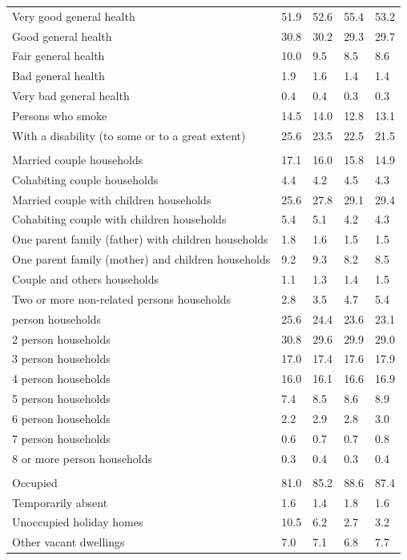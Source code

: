 \documentclass{article}
\begin{document}
\begin{table}[h]
\begin{tabular}{KTTTT}
    \hline
Very good general health & 51.9& 52.6&55.4& 53.2\\
Good general health & 30.8& 30.2& 29.3& 29.7\\
Fair general health & 10.0&  9.5& 8.5&  8.6\\
Bad general health & 1.9& 1.6&1.4& 1.4\\
Very bad general health & 0.4& 0.4&0.3& 0.3\\
    \hline
Persons who smoke & 14.5& 14.0&12.8& 13.1\\
    \hline
With a disability (to some or to a great extent) & 25.6& 23.5&22.5& 21.5\\
\hline
    \\ 
    \hline
Married couple households & 17.1& 16.0& 15.8& 14.9\\
Cohabiting couple households & 4.4& 4.2& 4.5& 4.3\\
Married couple with children households & 25.6& 27.8& 29.1& 29.4\\
Cohabiting couple with children households & 5.4& 5.1& 4.2& 4.3\\
One parent family (father) with  children households & 1.8& 1.6& 1.5& 1.5\\
One parent family (mother) and children households & 9.2& 9.3& 8.2& 8.5\\
Couple and others households  & 1.1& 1.3& 1.4& 1.5\\
Two or more non-related persons households & 2.8& 3.5& 4.7& 5.4\\
     person households & 25.6& 24.4& 23.6& 23.1\\
2 person households & 30.8& 29.6& 29.9& 29.0\\
3 person households & 17.0& 17.4& 17.6& 17.9\\
4 person households & 16.0& 16.1& 16.6& 16.9\\
5 person households & 7.4& 8.5& 8.6& 8.9\\
6 person households & 2.2& 2.9& 2.8& 3.0\\
7 person households & 0.6& 0.7& 0.7& 0.8\\
8 or more person households & 0.3& 0.4& 0.3& 0.4\\
\hline
    \\ 
    \hline
Occupied & 81.0& 85.2& 88.6& 87.4\\
Temporarily absent & 1.6& 1.4& 1.8& 1.6\\
Unoccupied holiday homes & 10.5&  6.2&  2.7&  3.2\\
Other vacant dwellings & 7.0& 7.1& 6.8& 7.7\\
\hline
\end{tabular}
\end{table}
\end{document}
